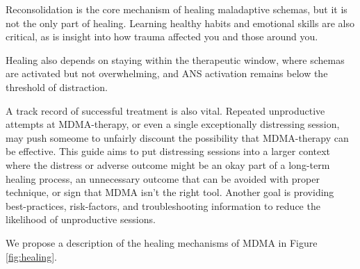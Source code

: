 \documentclass[12pt,letterpaper]{article}
\begin{document}
\vspace{\baselineskip}

Reconsolidation is the core mechanism of healing maladaptive schemas, but it is not the only part of healing. Learning healthy habits and emotional skills are also critical, as is insight into how trauma affected you and those around you.

Healing also depends on staying within the therapeutic window, where schemas are activated but not overwhelming, and ANS activation remains below the threshold of distraction.

A track record of successful treatment is also vital. Repeated unproductive attempts at MDMA-therapy, or even a single exceptionally distressing session, may push someome to unfairly discount the possibility that MDMA-therapy can be effective. This guide aims to put distressing sessions into a larger context where the distress or adverse outcome might be an okay part of a long-term healing process, an unnecessary outcome that can be avoided with proper technique, or sign that MDMA isn't the right tool. Another goal is providing best-practices, risk-factors, and troubleshooting information to reduce the likelihood of unproductive sessions.

We propose a description of the healing mechanisms of MDMA in Figure \ref{fig:healing}.
\end{document}

